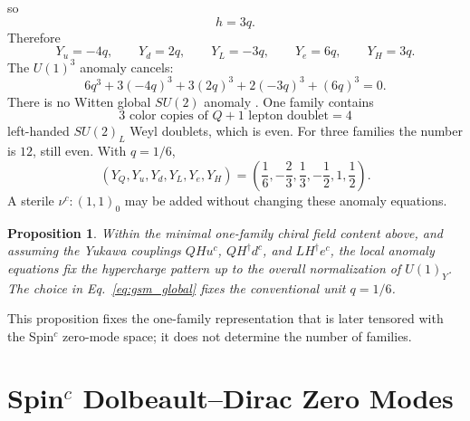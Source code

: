 \documentclass[aps,prd,preprint,notitlepage,nofootinbib,superscriptaddress,floatfix]{revtex4-2}
\newtheorem{proposition}{Proposition}
\theoremstyle{remark}
\begin{document}
so
\begin{equation}
h=3q.
\end{equation}
Therefore
\begin{equation}
Y_u=-4q,\qquad
Y_d=2q,\qquad
Y_L=-3q,\qquad
Y_e=6q,\qquad
Y_H=3q.
\end{equation}
The \(U(1)^3\) anomaly cancels:
\begin{equation}
6q^3+3(-4q)^3+3(2q)^3+2(-3q)^3+(6q)^3
=0.
\end{equation}
There is no Witten global \(SU(2)\) anomaly \cite{Witten1982SU2}.
One family contains
\begin{equation}
3\text{ color copies of }Q
+
1\text{ lepton doublet}
=4
\label{eq:witten_su2_count}
\end{equation}
left-handed \(SU(2)_L\) Weyl doublets, which is even.
For three families the number is \(12\), still even.
With \(q=1/6\),
\begin{equation}
\boxed{
(Y_Q,Y_u,Y_d,Y_L,Y_e,Y_H)
=
\left(
\frac16,
-\frac23,
\frac13,
-\frac12,
1,
\frac12
\right).
}
\label{eq:SM_hypercharges}
\end{equation}
A sterile \(\nu^c:(1,1)_0\) may be added without changing these anomaly equations.

\begin{proposition}
Within the minimal one-family chiral field content above, and assuming the Yukawa couplings \(QHu^c\), \(QH^\dagger d^c\), and \(LH^\dagger e^c\), the local anomaly equations fix the hypercharge pattern up to the overall normalization of \(U(1)_Y\).
The choice in Eq.~\eqref{eq:gsm_global} fixes the conventional unit \(q=1/6\).
\end{proposition}
This proposition fixes the one-family representation that is later tensored with the Spin\(^c\) zero-mode space; it does not determine the number of families.

\section{\texorpdfstring{Spin\(^c\) Dolbeault--Dirac Zero Modes}{Spinc Dolbeault-Dirac Zero Modes}}
\label{sec:spinc_dirac}
\end{document}
